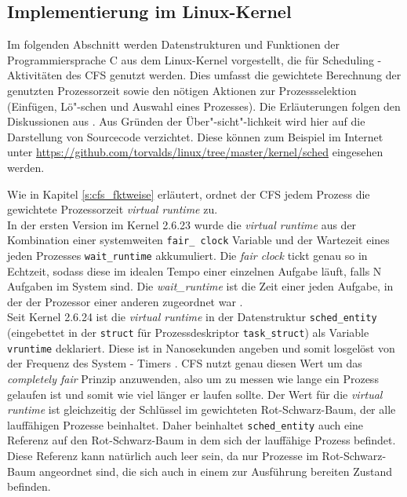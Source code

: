 \subsection{Implementierung im Linux-Kernel}\label{s:cstructs}
Im folgenden Abschnitt werden Datenstrukturen und Funktionen der Programmiersprache C aus dem Linux-Kernel vorgestellt, die für Scheduling - Aktivitäten des CFS genutzt werden. Dies umfasst die gewichtete Berechnung der genutzten Prozessorzeit sowie den nötigen Aktionen zur Prozessselektion (Einfügen, Lö"-schen und Auswahl eines Prozesses). Die Erläuterungen folgen den Diskussionen aus \cite{rlove}. Aus Gründen der Über"-sicht"-lichkeit wird hier auf die Darstellung von Sourcecode verzichtet. Diese können zum Beispiel im Internet unter \url{https://github.com/torvalds/linux/tree/master/kernel/sched} eingesehen werden.

Wie in Kapitel \ref{s:cfs_fktweise} erläutert, ordnet der CFS jedem Prozess die gewichtete Prozessorzeit \textit{virtual runtime} zu. \\
In der ersten Version im Kernel 2.6.23 wurde die \textit{virtual runtime} aus der Kombination einer systemweiten \texttt{fair\_ clock} Variable und der Wartezeit eines jeden Prozesses \texttt{wait\_runtime} akkumuliert. Die \textit{fair clock} tickt genau so in Echtzeit, sodass diese im idealen Tempo einer einzelnen Aufgabe läuft, falls N Aufgaben im System sind. Die \textit{wait\_runtime} ist die Zeit einer jeden Aufgabe, in der der Prozessor einer anderen zugeordnet war \cite{cpabla}.\\
Seit Kernel 2.6.24 ist die \textit{virtual runtime} in der Datenstruktur \texttt{sched\_entity} (eingebettet in der \texttt{struct} für Prozessdeskriptor \texttt{task\_struct}) als Variable \texttt{vruntime} deklariert. Diese ist in Nanosekunden angeben und somit losgelöst von der Frequenz des System - Timers \cite{rlove}. CFS nutzt genau diesen Wert um das \textit{completely fair} Prinzip anzuwenden, also um zu messen wie lange ein Prozess gelaufen ist und somit wie viel länger er laufen sollte.
Der Wert für die \textit{virtual runtime} ist gleichzeitig der Schlüssel im gewichteten Rot-Schwarz-Baum, der alle lauffähigen Prozesse beinhaltet. Daher beinhaltet \texttt{sched\_entity} auch eine Referenz auf den Rot-Schwarz-Baum in dem sich der lauffähige Prozess befindet. Diese Referenz kann natürlich auch leer sein, da nur Prozesse im Rot-Schwarz-Baum angeordnet sind, die sich auch in einem zur Ausführung bereiten Zustand befinden.

